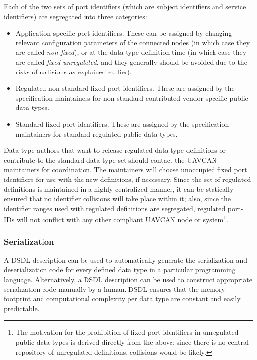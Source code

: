 Each of the two sets of port identifiers (which are subject identifiers and service identifiers) are
segregated into three categories:

\begin{itemize}
    \item Application-specific port identifiers.
          These can be assigned by changing relevant configuration parameters of the connected nodes
          (in which case they are called \emph{non-fixed}),
          or at the data type definition time (in which case they are called \emph{fixed unregulated},
          and they generally should be avoided due to the risks of collisions as explained earlier).

    \item Regulated non-standard fixed port identifiers.
          These are assigned by the specification maintainers for non-standard contributed
          vendor-specific public data types.

    \item Standard fixed port identifiers. These are assigned by the specification maintainers
          for standard regulated public data types.
\end{itemize}

Data type authors that want to release regulated data type definitions or contribute to the standard data
type set should contact the UAVCAN maintainers for coordination.
The maintainers will choose unoccupied fixed port identifiers for use with the new definitions, if necessary.
Since the set of regulated definitions is maintained in a highly centralized manner,
it can be statically ensured that no identifier collisions will take place within it;
also, since the identifier ranges used with regulated definitions are segregated,
regulated port-IDs will not conflict with any other compliant UAVCAN node or system\footnote{%
    The motivation for the prohibition of fixed port identifiers in unregulated public data types is
    derived directly from the above: since there is no central repository of unregulated definitions,
    collisions would be likely.
}.

\subsubsection{Serialization}

A DSDL description can be used to automatically generate the serialization and deserialization code
for every defined data type in a particular programming language.
Alternatively, a DSDL description can be used to construct appropriate serialization code manually by a human.
DSDL ensures that the memory footprint and computational complexity per data type
are constant and easily predictable.

